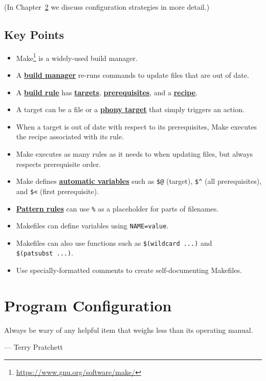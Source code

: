 \documentclass[
]{krantz}
\providecommand{\tightlist}{%
  \setlength{\itemsep}{0pt}\setlength{\parskip}{0pt}}
\renewenvironment{quote}{\begin{VF}}{\end{VF}}
\renewcommand{\href}[2]{#2\footnote{\url{#1}}}
\newcommand{\gref}[2]{\hyperlink{#2}{\textbf{#1}}}
\begin{document}
(In Chapter~\ref{config} we discuss configuration strategies in more detail.)

\hypertarget{automate-keypoints}{%
\section{Key Points}\label{automate-keypoints}}

\begin{itemize}
\tightlist
\item
  \href{https://www.gnu.org/software/make/}{Make} is a widely-used build manager.
\item
  A \gref{build manager}{build\_manager} re-runs commands to update files that are out of date.
\item
  A \gref{build rule}{build\_rule} has \gref{targets}{build\_target}, \gref{prerequisites}{prerequisite}, and a \gref{recipe}{build\_recipe}.
\item
  A target can be a file or a \gref{phony target}{phony\_target} that simply triggers an action.
\item
  When a target is out of date with respect to its prerequisites, Make executes the recipe associated with its rule.
\item
  Make executes as many rules as it needs to when updating files, but always respects prerequisite order.
\item
  Make defines \gref{automatic variables}{automatic\_variable} such as \texttt{\$@} (target), \texttt{\$\^{}} (all prerequisites), and \texttt{\$\textless{}} (first prerequisite).
\item
  \gref{Pattern rules}{pattern\_rule} can use \texttt{\%} as a placeholder for parts of filenames.
\item
  Makefiles can define variables using \texttt{NAME=value}.
\item
  Makefiles can also use functions such as \texttt{\$(wildcard\ ...)} and \texttt{\$(patsubst\ ...)}.
\item
  Use specially-formatted comments to create self-documenting Makefiles.
\end{itemize}

\hypertarget{config}{%
\chapter{Program Configuration}\label{config}}

\begin{quote}
Always be wary of any helpful item that weighs less than its operating manual.

--- Terry Pratchett
\end{quote}
\end{document}
